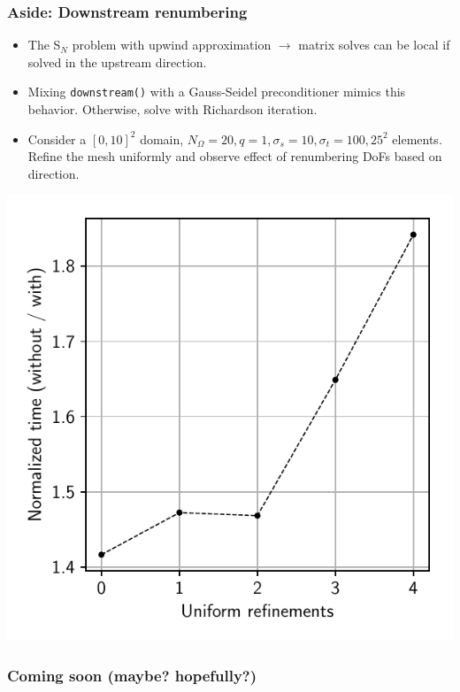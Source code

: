 \documentclass[xcolor={usenames,dvipsnames,svgnames,table}]{beamer}
\begin{document}
\begin{frame}\frametitle{Aside: Downstream renumbering}
	\begin{minipage}{0.52\linewidth}
		\begin{itemize}
			\item The S$_N$ problem with upwind approximation $\rightarrow$ matrix solves can be local if solved in the upstream direction.
			\item Mixing \texttt{downstream()} with a Gauss-Seidel preconditioner mimics this behavior. Otherwise, solve with Richardson iteration.
			\item Consider a $[0,10]^2$ domain, $N_\Omega = 20, q = 1, \sigma_s = 10, \sigma_t = 100, 25^2$ elements. Refine the mesh uniformly and observe effect of renumbering DoFs based on direction.
		\end{itemize}
	\end{minipage}
	\hfill
	\begin{minipage}{0.45\linewidth}
		\includegraphics[width=\linewidth]{plots/renumbering}
	\end{minipage}
\end{frame}


\begin{frame}\frametitle{Coming soon \tiny{(maybe? hopefully?)}}

\end{frame}
\end{document}
